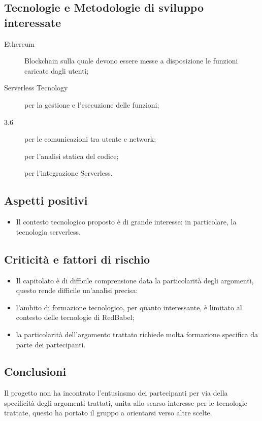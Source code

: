 \documentclass[../studio-di-fattibilita.tex]{subfiles}
\begin{document}
  \subsection{Tecnologie e Metodologie di sviluppo interessate}%
  \label{subsec:tecnologie_interessate}
  \begin{description}
    \item[Ethereum] Blockchain sulla quale devono essere messe a disposizione le funzioni caricate dagli utenti;
    \item[Serverless Tecnology] per la gestione e l'esecuzione delle funzioni;
    \item[ 3.6] per le comunicazioni tra utente e network;
    \item[] per l'analisi statica del codice;
    \item[] per l'integrazione Serverless.
  \end{description}
  \subsection{Aspetti positivi}%
  \label{subsec:aspetti_positivi}
  \begin{itemize}
    \item Il contesto tecnologico proposto è di grande interesse: in particolare, la tecnologia serverless.
  \end{itemize}
  \subsection{Criticità e fattori di rischio}%
  \label{subsec:criticita_e_fattori_di_rischio}
  \begin{itemize}
    \item Il capitolato è di difficile comprensione data la particolarità degli argomenti, questo rende difficile un'analisi precisa:
    \item l'ambito di formazione tecnologico, per quanto interessante, è limitato al contesto delle tecnologie di RedBabel;
    \item la particolarità dell'argomento trattato richiede molta formazione specifica da parte dei partecipanti.
  \end{itemize}
  \subsection{Conclusioni}%
  \label{subsec:conclusioni}
  Il progetto non ha incontrato l'entusiasmo dei partecipanti per via della specificità degli argomenti trattati, unita allo scarso interesse per le tecnologie trattate, questo ha portato il gruppo a orientarsi verso altre scelte.
\end{document}
